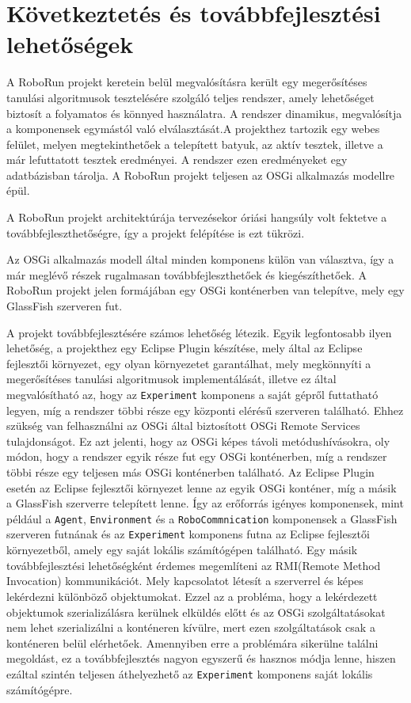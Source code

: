 \chapter{Következtetés és továbbfejlesztési lehetőségek}\label{ch:KOVETKEZTETESEK}

A RoboRun projekt keretein belül megvalósításra került egy megerősítéses tanulási algoritmusok tesztelésére szolgáló teljes rendszer, amely lehetőséget biztosít a folyamatos és könnyed használatra. A rendszer dinamikus, megvalósítja a komponensek egymástól való elválasztását.A projekthez tartozik egy webes felület, melyen megtekinthetőek a telepített batyuk, az aktív tesztek, illetve a már lefuttatott tesztek eredményei. A rendszer ezen eredményeket egy adatbázisban tárolja. A RoboRun projekt teljesen az OSGi alkalmazás modellre épül.

A RoboRun projekt architektúrája tervezésekor óriási hangsúly volt fektetve a továbbfejleszthetőségre, így a projekt felépítése is ezt tükrözi.

Az OSGi alkalmazás modell által minden komponens külön van választva, így a már meglévő részek rugalmasan továbbfejleszthetőek és kiegészíthetőek. A RoboRun projekt jelen formájában egy OSGi konténerben van telepítve, mely egy GlassFish szerveren fut.

A projekt továbbfejlesztésére számos lehetőség létezik. Egyik legfontosabb ilyen lehetőség, a projekthez egy Eclipse Plugin\cite{eclipseplugin} készítése, mely által az Eclipse fejlesztői környezet, egy olyan környezetet garantálhat, mely megkönnyíti a megerősítéses tanulási algoritmusok implementálását, illetve ez által megvalósítható az, hogy az \texttt{Experiment} komponens a saját gépről futtatható legyen, míg a rendszer többi része egy központi elérésű szerveren található. Ehhez szükség van felhasználni az OSGi által biztosított OSGi Remote Services tulajdonságot. Ez azt jelenti, hogy az OSGi képes távoli metódushívásokra, oly módon, hogy a rendszer egyik része fut egy OSGi konténerben, míg a rendszer többi része  egy teljesen más OSGi konténerben található. Az Eclipse Plugin esetén az Eclipse fejlesztői környezet lenne az egyik OSGi konténer, míg a másik a GlassFish szerverre telepített lenne. Így az erőforrás igényes komponensek, mint például a \texttt{Agent}, \texttt{Environment} és a \texttt{RoboCommnication} komponensek a GlassFish szerveren futnának és az \texttt{Experiment} komponens futna az Eclipse fejlesztői környezetből, amely egy saját lokális számítógépen található. 
Egy másik továbbfejlesztési lehetőségként érdemes megemlíteni az RMI(Remote Method Invocation) kommunikációt. Mely kapcsolatot létesít a szerverrel és képes lekérdezni különböző objektumokat. Ezzel az a probléma, hogy a lekérdezett objektumok szerializálásra kerülnek elküldés előtt és az OSGi szolgáltatásokat nem lehet szerializálni a konténeren kívülre, mert ezen szolgáltatások csak a konténeren belül elérhetőek. Amennyiben erre a problémára sikerülne találni megoldást, ez a továbbfejlesztés nagyon egyszerű és hasznos módja lenne, hiszen ezáltal szintén teljesen áthelyezhető az \texttt{Experiment} komponens saját lokális számítógépre.

